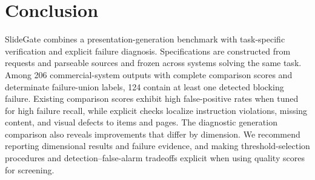 \section{Conclusion}
SlideGate combines a presentation-generation benchmark with task-specific verification and explicit failure diagnosis. Specifications are constructed from requests and parseable sources and frozen across systems solving the same task. Among 206 commercial-system outputs with complete comparison scores and determinate failure-union labels, 124 contain at least one detected blocking failure. Existing comparison scores exhibit high false-positive rates when tuned for high failure recall, while explicit checks localize instruction violations, missing content, and visual defects to items and pages. The diagnostic generation comparison also reveals improvements that differ by dimension. We recommend reporting dimensional results and failure evidence, and making threshold-selection procedures and detection--false-alarm tradeoffs explicit when using quality scores for screening.

